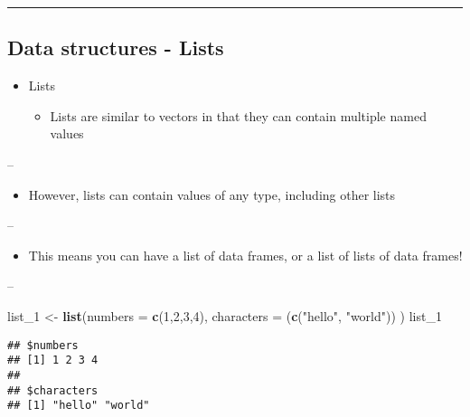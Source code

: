 \documentclass[]{article}
\newenvironment{Shaded}{\begin{snugshade}}{\end{snugshade}}
\newcommand{\DataTypeTok}[1]{\textcolor[rgb]{0.13,0.29,0.53}{#1}}
\newcommand{\DecValTok}[1]{\textcolor[rgb]{0.00,0.00,0.81}{#1}}
\newcommand{\KeywordTok}[1]{\textcolor[rgb]{0.13,0.29,0.53}{\textbf{#1}}}
\newcommand{\NormalTok}[1]{#1}
\newcommand{\StringTok}[1]{\textcolor[rgb]{0.31,0.60,0.02}{#1}}
\providecommand{\tightlist}{%
  \setlength{\itemsep}{0pt}\setlength{\parskip}{0pt}}
\begin{document}
\begin{center}\rule{0.5\linewidth}{\linethickness}\end{center}

\hypertarget{data-structures---lists}{%
\subsection{Data structures - Lists}\label{data-structures---lists}}

\begin{itemize}
\tightlist
\item
  Lists

  \begin{itemize}
  \tightlist
  \item
    Lists are similar to vectors in that they can contain multiple named
    values
  \end{itemize}
\end{itemize}

--

\begin{itemize}
\tightlist
\item
  However, lists can contain values of any type, including other lists
\end{itemize}

--

\begin{itemize}
\tightlist
\item
  This means you can have a list of data frames, or a list of lists of
  data frames!
\end{itemize}

--

\begin{Shaded}
\begin{Highlighting}[]
\NormalTok{list_}\DecValTok{1}\NormalTok{ <-}\StringTok{ }\KeywordTok{list}\NormalTok{(}\DataTypeTok{numbers =} \KeywordTok{c}\NormalTok{(}\DecValTok{1}\NormalTok{,}\DecValTok{2}\NormalTok{,}\DecValTok{3}\NormalTok{,}\DecValTok{4}\NormalTok{),}
               \DataTypeTok{characters =}\NormalTok{ (}\KeywordTok{c}\NormalTok{(}\StringTok{"hello"}\NormalTok{, }\StringTok{"world"}\NormalTok{))}
\NormalTok{)}
\NormalTok{list_}\DecValTok{1}
\end{Highlighting}
\end{Shaded}

\begin{verbatim}
## $numbers
## [1] 1 2 3 4
## 
## $characters
## [1] "hello" "world"
\end{verbatim}
\end{document}
